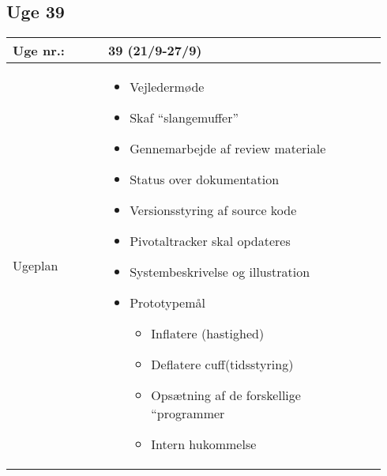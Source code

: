 	\subsection{Uge 39}
	\begin{longtable}{|p{0.24\linewidth}|p{0.7\linewidth}|}
		\hline
		Uge nr.: & 39 (21/9-27/9)\\ \hline
		Ugeplan & 
		\begin{itemize}
			\item Vejledermøde 
			\item Skaf “slangemuffer”
			\item Gennemarbejde af review materiale 
			\item Status over dokumentation
			\item Versionsstyring af source kode
			\item Pivotaltracker skal opdateres
			\item Systembeskrivelse og illustration 
			\item Prototypemål
			\begin{itemize}
				\item Inflatere (hastighed) 
				\item Deflatere cuff(tidsstyring)
				\item Opsætning af de forskellige “programmer
				\item Intern hukommelse
			\end{itemize}
		\end{itemize}
	

\end{longtable}
